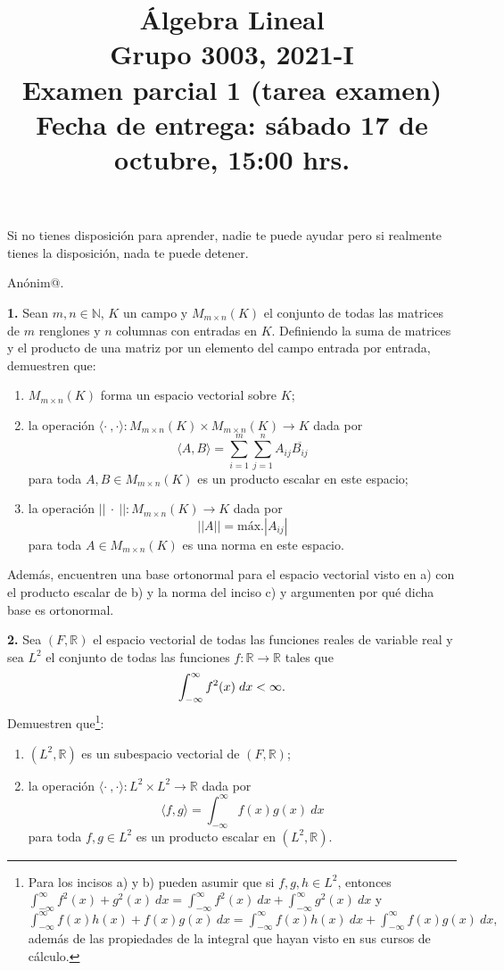 \documentclass[a4paper]{article}
\begin{document}
\title{Álgebra Lineal \\ Grupo 3003, 2021-I \\ Examen parcial 1 (tarea examen) \\ Fecha de entrega: sábado 17 de octubre, 15:00 hrs.}
\date{}
\maketitle

\epigraph{Si no tienes disposición para aprender, nadie te puede ayudar \textemdash pero si realmente tienes la disposición, nada te puede detener.}{\textemdash Anónim@.}

\vspace{5mm}
\textbf{1.} Sean $m,n\in\mathbb{N}$, $K$ un campo y $M_{m\times n}(K)$ el conjunto de todas las matrices de $m$ renglones y $n$ columnas con entradas en $K$. Definiendo la suma de matrices y el producto de una matriz por un elemento del campo entrada por entrada, demuestren que:
\begin{enumerate}[label=\alph*)]
    \item $M_{m\times n}(K)$ forma un espacio vectorial sobre $K$;
    \item la operación $\langle\cdot \ ,\cdot\rangle:M_{m\times n}(K)\times M_{m\times n}(K)\to K$ dada por $$\langle A,B\rangle = \sum_{i=1}^m \sum_{j=1}^n A_{ij}\overline{B_{ij}}$$ para toda $A,B\in M_{m\times n}(K)$ es un producto escalar en este espacio;
    \item la operación $|| \ \cdot \ ||:M_{m\times n}(K)\to K$ dada por $$||A|| = \text{máx.}|A_{ij}|$$ para toda $A\in M_{m\times n}(K)$ es una norma en este espacio.
\end{enumerate}

Además, encuentren una base ortonormal para el espacio vectorial visto en a) con el producto escalar de b) y la norma del inciso c) y argumenten por qué dicha base es ortonormal.

\vspace{5mm}
\textbf{2.} Sea $(F,\mathbb{R})$ el espacio vectorial de todas las funciones reales de variable real y sea $L^2$ el conjunto de todas las funciones $f:\mathbb{R}\to\mathbb{R}$ tales que $$\int_{-\infty}^{\infty} f^2(x) \hspace{1mm} dx < \infty.$$ Demuestren que\footnote{Para los incisos a) y b) pueden asumir que si $f,g,h\in L^2$, entonces $\int_{-\infty}^{\infty} f^2(x)+g^2(x) \ dx = \int_{-\infty}^{\infty} f^2(x) \ dx + \int_{-\infty}^{\infty}g^2(x) \ dx $ y $\int_{-\infty}^{\infty}f(x)h(x) + f(x)g(x) \ dx = \int_{-\infty}^{\infty} f(x)h(x) \ dx + \int_{-\infty}^{\infty} f(x)g(x) \ dx,$ además de las propiedades de la integral que hayan visto en sus cursos de cálculo.}:
\begin{enumerate}[label=\alph*)]
    \item $(L^2,\mathbb{R})$ es un subespacio vectorial de $(F,\mathbb{R})$;
    \item la operación $\langle\cdot \ ,\cdot\rangle:L^2\times L^2\to\mathbb{R}$ dada por $$\langle f,g\rangle = \int_{-\infty}^{\infty}f(x)g(x) \ dx$$ para toda $f,g\in L^2$ es un producto escalar en $(L^2,\mathbb{R})$.
\end{enumerate}
\end{document}
